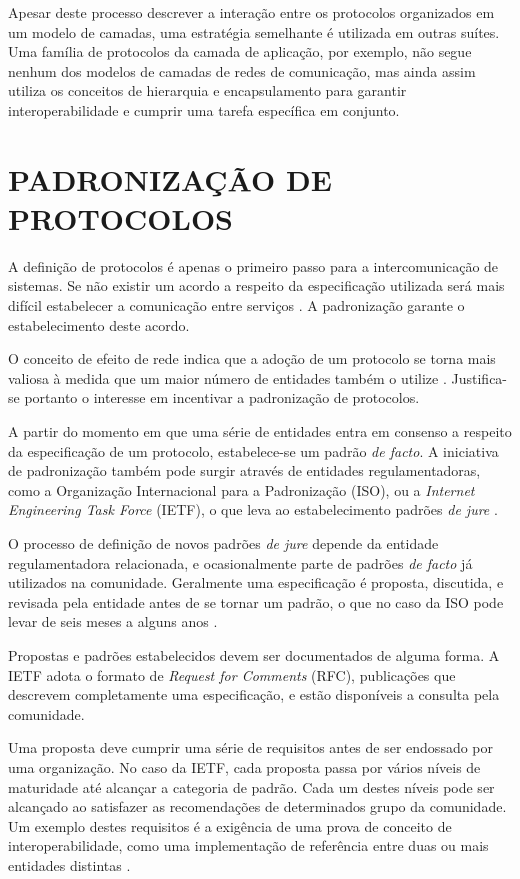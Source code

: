 Apesar deste processo descrever a interação entre os protocolos organizados em um
modelo de camadas, uma estratégia semelhante é utilizada em outras suítes. Uma
família de protocolos da camada de aplicação, por exemplo, não segue nenhum dos
modelos de camadas de redes de comunicação, mas ainda assim utiliza os conceitos de
hierarquia e encapsulamento para garantir interoperabilidade e cumprir uma tarefa
específica em conjunto.



\section{PADRONIZAÇÃO DE PROTOCOLOS}

A definição de protocolos é apenas o primeiro passo para a intercomunicação de
sistemas. Se não existir um acordo a respeito da especificação utilizada será mais
difícil estabelecer a comunicação entre serviços \cite{kurose2012}. A padronização
garante o estabelecimento deste acordo.

O conceito de efeito de rede indica que a adoção de um protocolo se torna mais
valiosa à medida que um maior número de entidades também o utilize
\cite{liebowitz1998}. Justifica-se portanto o interesse em incentivar a padronização
de protocolos.

A partir do momento em que uma série de entidades entra em consenso a respeito da
especificação de um protocolo, estabelece-se um padrão \textit{de facto}. A
iniciativa de padronização também pode surgir através de entidades regulamentadoras,
como a Organização Internacional para a Padronização (ISO), ou a \textit{Internet
Engineering Task Force} (IETF), o que leva ao estabelecimento padrões \textit{de
jure} \cite{tanenbaum2010}.

O processo de definição de novos padrões \textit{de jure} depende da entidade
regulamentadora relacionada, e ocasionalmente parte de padrões \textit{de facto} já
utilizados na comunidade. Geralmente uma especificação é proposta, discutida, e
revisada pela entidade antes de se tornar um padrão, o que no caso da ISO pode levar
de seis meses a alguns anos \cite{tanenbaum2010}.

Propostas e padrões estabelecidos devem ser documentados de alguma forma. A IETF
adota o formato de \textit{Request for Comments} (RFC), publicações que descrevem
completamente uma especificação, e estão disponíveis a consulta pela comunidade.

Uma proposta deve cumprir uma série de requisitos antes de ser endossado por uma
organização. No caso da IETF, cada proposta passa por vários níveis de maturidade
até alcançar a categoria de padrão. Cada um destes níveis pode ser alcançado ao
satisfazer as recomendações de determinados grupo da comunidade. Um exemplo destes
requisitos é a exigência de uma prova de conceito de interoperabilidade, como uma
implementação de referência entre duas ou mais entidades distintas \cite{rfc1280}.


